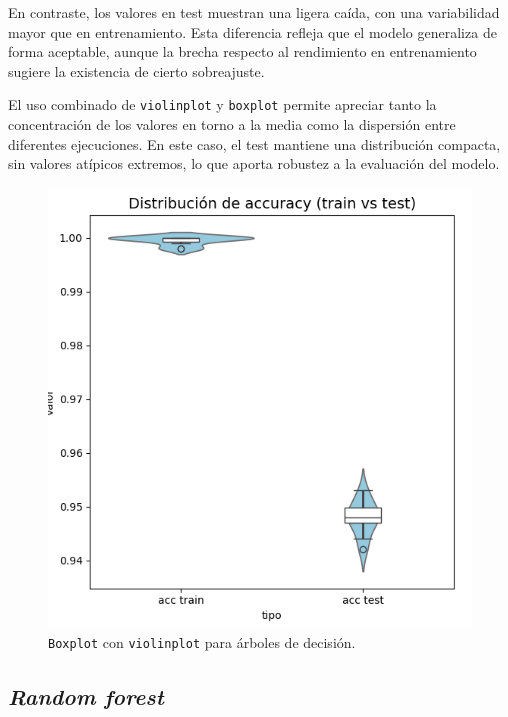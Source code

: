 \newpage

En contraste, los valores en test muestran una ligera caída, con una variabilidad mayor que en entrenamiento. Esta diferencia refleja que el modelo generaliza de forma aceptable, aunque la brecha respecto al rendimiento en entrenamiento sugiere la existencia de cierto sobreajuste.

\vspace{1em}

El uso combinado de \texttt{violinplot} y \texttt{boxplot} permite apreciar tanto la concentración de los valores en torno a la media como la dispersión entre diferentes ejecuciones. En este caso, el test mantiene una distribución compacta, sin valores atípicos extremos, lo que aporta robustez a la evaluación del modelo.

\begin{figure}[H]
	\centering
	\includegraphics[width=1\linewidth]{Imagenes/dt_bin}
	\caption[\texttt{Boxplot} con \texttt{violinplot} para árboles de decisión]{\texttt{Boxplot} con \texttt{violinplot} para árboles de decisión.}
	\label{fig:dt_bin}
\end{figure}

\newpage
\subsection{\textit{Random forest}}
\label{subsec:rf_bin}

